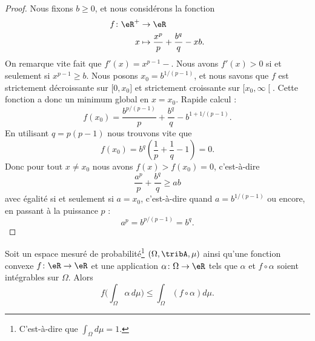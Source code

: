 \begin{proof}
	Nous fixons \( b\geq 0\), et nous considérons la fonction
	\begin{equation}
		\begin{aligned}
			f\colon \eR^+ & \to \eR                                         \\
			x             & \mapsto \frac{ x^p }{ p }+\frac{ b^q }{ q }-xb.
		\end{aligned}
	\end{equation}
	On remarque vite fait que \( f'(x)=x^{p-1}-\). Nous avons \( f'(x)>0\) si et seulement si \( x^{p-1}\geq b\). Nous posons \( x_0=b^{1/(p-1)}\), et nous savons que \( f\) est strictement décroissante sur \( \mathopen[ 0,x_0\mathclose]\) et strictement croissante sur \( \mathopen[ x_0,\infty\mathclose[\). Cette fonction a donc un minimum global en \( x=x_0\). Rapide calcul :
	\begin{equation}
		f(x_0)=\frac{ b^{p/(p-1)} }{ p }+\frac{ b^q }{ q }-b^{1+1/(p-1)}.
	\end{equation}
	En utilisant \( q=p(p-1)\) nous trouvons vite que
	\begin{equation}
		f(x_0)=b^q\left( \frac{1}{ p}+\frac{1}{ q}-1 \right)=0.
	\end{equation}
	Donc pour tout \( x\neq x_0\) nous avons \( f(x)>f(x_0)=0\), c'est-à-dire
	\begin{equation}
		\frac{ a^p }{ p }+\frac{ b^q }{ q }\geq ab
	\end{equation}
	avec égalité si et seulement si \( a=x_0\), c'est-à-dire quand \( a=b^{1/(p-1)}\) ou encore, en passant à la puissance \( p\) :
	\begin{equation}
		a^p=b^{p/(p-1)}=b^q.
	\end{equation}
\end{proof}

\begin{proposition} \label{PropXISooBxdaLk}
	Soit un espace mesuré de probabilité\footnote{C'est-à-dire que \( \int_{\Omega}d\mu=1\).} \( (\Omega,\tribA,\mu)\) ainsi qu'une fonction convexe \( f\colon \eR\to \eR\) et une application \( \alpha\colon \Omega\to \eR\) tels que \( \alpha\) et \( f\circ \alpha\) soient intégrables sur \( \Omega\). Alors
	\begin{equation}
		f\Big( \int_{\Omega}\alpha\,d\mu \Big)\leq \int_{\Omega}(f\circ\alpha) d\mu.
	\end{equation}
\end{proposition}

